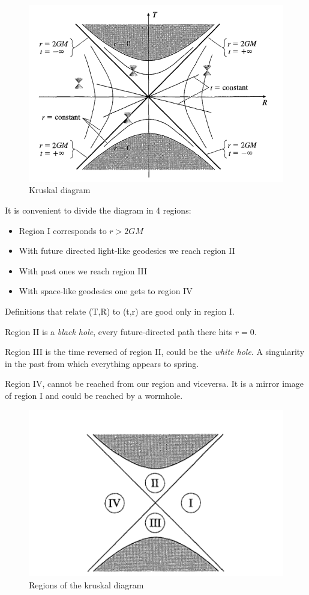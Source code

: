 \begin{figure}[h]
\centering
\includegraphics[width=\linewidth]{imm/ksdiagram.png}
\caption{Kruskal diagram}
\label{imm:ksdiagram}
\end{figure}
It is convenient to divide the diagram in 4 regions:
\begin{itemize}
\item Region I corresponds to $r>2GM$
\item With future directed light-like geodesics we reach region II
\item With past ones we reach region III
\item With space-like geodesics one gets to region IV
\end{itemize}
Definitions that relate (T,R) to (t,r) are good only in region I.\par
Region II is a \emph{black hole}, every future-directed path there hits $r=0$.\par
Region III is the time reversed of region II, could be the \emph{ white hole}. A singularity in the past from which everything appears to spring.\par
Region IV, cannot be reached from our region and viceversa. It is a mirror image of region I and could be reached by a wormhole.
\begin{figure}[h]
\centering
\includegraphics[width=\linewidth]{imm/kregion.png}
\caption{Regions of the kruskal diagram}
\label{imm:kregion.png}
\end{figure}
